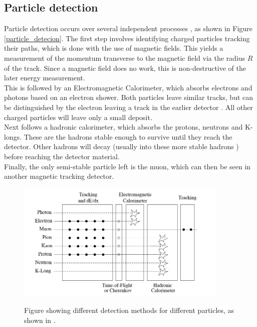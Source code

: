 \documentclass[12 pt]{article}
\begin{document}
		\subsection{Particle detection}
			Particle detection occurs over several independent processes \cite{notes13}, as shown in Figure \ref{particle_detecion}. The first step involves identifying charged particles  tracking their paths, which is done with the use of magnetic fields. This yields a measurement of the momentum transverse to the magnetic field via the radius $R$ of the track. Since a magnetic field does no work, this is non-destructive of the later energy measurement. \\
			This is followed by an Electromagnetic Calorimeter, which absorbs electrons and photons based on an electron shower. Both particles leave similar tracks, but can be distinguished by the electron leaving a track in the earlier detector \cite{}. All other charged particles will leave only a small deposit. \\
			Next follows a hadronic calorimeter, which absorbs the protons, neutrons and K-longs. These are the hadrons stable enough to survive until they reach the detector. Other hadrons will decay (usually into these more stable hadrons \cite{}) before reaching the detector material. \\
			Finally, the only semi-stable particle left is the muon, which can then be seen in another magnetic tracking detector.
			\begin{figure}[h]
				\centering
				\includegraphics[width=0.9\textwidth]{particle_detection.png}
				\label{particle_detection}
				\caption{Figure showing different detection methods for different particles, as shown in \cite{notes13}.}
			\end{figure}
\end{document}
